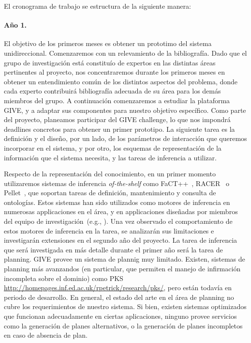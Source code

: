 
El cronograma de trabajo se estructura de la siguiente manera:

\paragraph{A\~no 1.} El objetivo de los primeros meses es obtener un
prototimo del sistema unidireccional.  Comenzaremos con un relevamiento
de la bibliograf\'ia.  Dado que el grupo de investigaci\'on est\'a
constitu\'io de expertos en las distintas \'areas pertinentes al
proyecto, nos concentraremos durante los primeros meses en obtener un
entendimiento com\'un de los distintos aspectos del problema, donde
cada experto contribuir\'a bibliograf\'ia adecuada de su \'area para los
dem\'as miembros del grupo.  A continuaci\'on comenzaremos a estudiar
la plataforma GIVE, y a adaptar sus componentes para nuestro objetivo
espec\'ifico.  Como parte del proyecto, planeamos participar del GIVE
challenge, lo que nos impondr\'a deadlines concretos para obtener un
primer prototipo.  La siguiente tarea es la definici\'on  y el dise\~no,
por un lado, de los par\'ametros de interacci\'on que queremos incorporar
en el sistema, y por otro, los esquemas de representaci\'on de la
informaci\'on que el sistema necesita, y las tareas de inferencia a
utilizar.


Respecto de la representaci\'on del conocimiento, en un primer momento
utilizaremos sistemas de inferencia \emph{of-the-shelf} como
FaCT++~\citep{horr:fact99},
RACER~\citep{haar:race99} o Pellet~\citep{XXX}, que soportan tareas de
definici\'on, mantenimiento y consulta de ontolog\'ias.  Estos sistemas
han sido utilizados como motores de inferencia
en numerosas applicaciones en el \'area, y en applicaciones
dise\~nadas por miembros del equipo de
investigaci\'on~(e.g., \citep{FROLOG}).  Una vez observado el comportamiento de
estos motores de inferencia en la tarea, se analizar\'an sus limitaciones
e investigar\'an extensiones en el segundo a\~no del proyecto.  La tarea
de inferencia que ser\'a investigada en m\'as detalle durante el primer
a\~no ser\'a la tarea de planning.  GIVE provee un sistema de plannig muy
limitado.  Existen, sistemas de planning m\'as avanzandos (en particular,
que permiten el manejo de infirmaci\'on incompleta sobre el dominio)
como PKS \url{http://homepages.inf.ed.ac.uk/rpetrick/research/pks/}, pero
est\'an todav\'ia en periodo de desarrollo.  En general, el estado del
arte en el \'area de planning no cubre los requerimientos de nuestro
sistema.  Si bien, existen sistemas optimizados que funcionan adecuadamente
en ciertas aplicaciones, ninguno provee servicios como la generaci\'on de
planes alternativos, o la generaci\'on de planes incompletos en caso de
absencia de plan.

